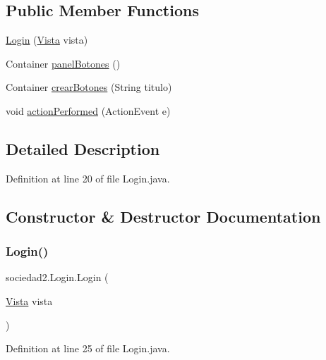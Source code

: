\subsection*{Public Member Functions}
\begin{DoxyCompactItemize}
\item 
\mbox{\hyperlink{classsociedad2_1_1_login_a41135064a97e4de4695a8d07074c35d6}{Login}} (\mbox{\hyperlink{classsociedad2_1_1_vista}{Vista}} vista)
\item 
Container \mbox{\hyperlink{classsociedad2_1_1_login_aca75f65b08cee82c43dccbfeb102b7d2}{panel\+Botones}} ()
\item 
Container \mbox{\hyperlink{classsociedad2_1_1_login_a08c7dd2e394966f747492b9bb70a6014}{crear\+Botones}} (String titulo)
\item 
void \mbox{\hyperlink{classsociedad2_1_1_login_ab4f019526871938dfc3f8bdd78c56650}{action\+Performed}} (Action\+Event e)
\end{DoxyCompactItemize}


\subsection{Detailed Description}


Definition at line 20 of file Login.\+java.



\subsection{Constructor \& Destructor Documentation}
\mbox{\label{classsociedad2_1_1_login_a41135064a97e4de4695a8d07074c35d6}} 
\subsubsection{\texorpdfstring{Login()}{Login()}}
{\footnotesize\ttfamily sociedad2.\+Login.\+Login (\begin{DoxyParamCaption}\item[{\mbox{\hyperlink{classsociedad2_1_1_vista}{Vista}}}]{vista }\end{DoxyParamCaption})}



Definition at line 25 of file Login.\+java.



